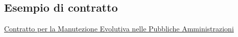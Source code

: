 \subsection{Esempio di contratto}\label{sub:cv_esempio_di_contratto} %
    \href{../standalone/contratto-manutenzione/build/contr-man-si.pdf}{Contratto per la Manutezione Evolutiva nelle Pubbliche Amministrazioni}
